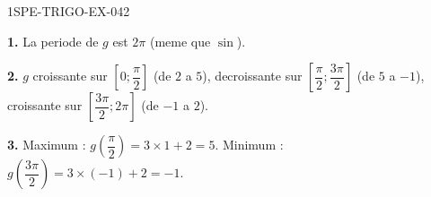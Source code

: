\begin{corrige}{1SPE-TRIGO-EX-042}

\textbf{1.} La periode de $g$ est $2\pi$ (meme que $\sin$).

\textbf{2.} $g$ croissante sur $\left[0;\dfrac{\pi}{2}\right]$ (de $2$ a $5$), decroissante sur $\left[\dfrac{\pi}{2};\dfrac{3\pi}{2}\right]$ (de $5$ a $-1$), croissante sur $\left[\dfrac{3\pi}{2};2\pi\right]$ (de $-1$ a $2$).

\textbf{3.} Maximum : $g\!\left(\dfrac{\pi}{2}\right) = 3 \times 1 + 2 = 5$. Minimum : $g\!\left(\dfrac{3\pi}{2}\right) = 3 \times (-1) + 2 = -1$.

\end{corrige}

